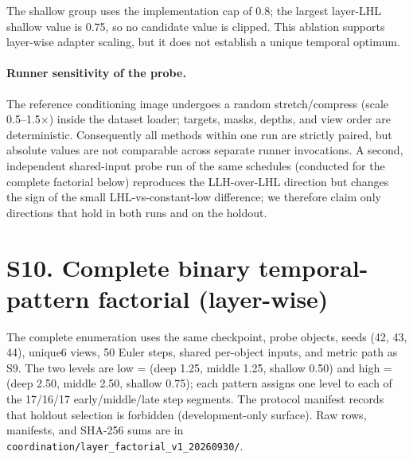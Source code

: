 \documentclass[10pt]{article}
\begin{document}
The shallow group uses the implementation cap of 0.8; the largest layer-LHL
shallow value is 0.75, so no candidate value is clipped. This ablation supports
layer-wise adapter scaling, but it does not establish a unique temporal optimum.

\paragraph{Runner sensitivity of the probe.} The reference conditioning image
undergoes a random stretch/compress (scale 0.5--1.5$\times$) inside the
dataset loader; targets, masks, depths, and view order are deterministic.
Consequently all methods within one run are strictly paired, but absolute
values are not comparable across separate runner invocations. A second,
independent shared-input probe run of the same schedules (conducted for the
complete factorial below) reproduces the LLH-over-LHL direction but changes
the sign of the small LHL-vs-constant-low difference; we therefore claim only
directions that hold in both runs and on the holdout.

\section{S10. Complete binary temporal-pattern factorial (layer-wise)}

The complete enumeration uses the same checkpoint, probe objects, seeds
(42, 43, 44), unique6 views, 50 Euler steps, shared per-object inputs, and
metric path as S9. The two levels are low = (deep 1.25, middle 1.25, shallow
0.50) and high = (deep 2.50, middle 2.50, shallow 0.75); each pattern assigns
one level to each of the 17/16/17 early/middle/late step segments. The
protocol manifest records that holdout selection is forbidden
(development-only surface). Raw rows, manifests, and SHA-256 sums are in
\texttt{coordination/layer\_factorial\_v1\_20260930/}.
\end{document}
